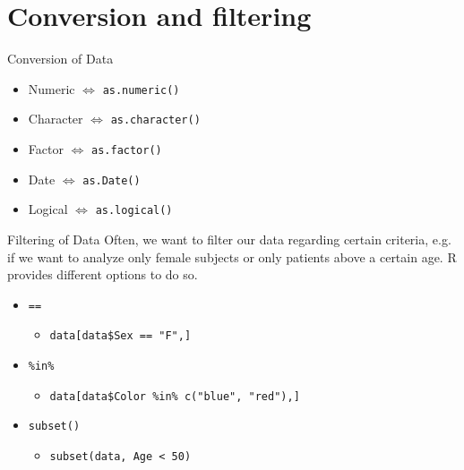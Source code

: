 \documentclass[aspectratio = 169]{chariteBeamer}
\begin{document}
\section{Conversion and filtering}
\begin{frame}[fragile]{Conversion of Data}
	\begin{itemize}
		\item Numeric $\Leftrightarrow$ \verb+as.numeric()+
		\item Character $\Leftrightarrow$ \verb+as.character()+
		\item Factor $\Leftrightarrow$ \verb+as.factor()+
		\item Date $\Leftrightarrow$ \verb+as.Date()+
		\item Logical $\Leftrightarrow$ \verb+as.logical()+
	\end{itemize}
\end{frame}



\begin{frame}[fragile]{Filtering of Data}
Often, we want to filter our data regarding certain criteria, e.g. if we want to analyze only female subjects or only patients above a certain age. R provides different options to do so.
	\begin{itemize}
		\item  \verb+==+
		\begin{itemize}
			\item  \verb+data[data$Sex == "F",]+
		\end{itemize}
		\item  \verb+%in%+
		\begin{itemize}
			\item  \verb+data[data$Color %in% c("blue", "red"),]+
		\end{itemize}
		\item  \verb+subset()+
		\begin{itemize}
			\item  \verb+subset(data, Age < 50)+
		\end{itemize}
	\end{itemize}
\end{frame}
\end{document}
